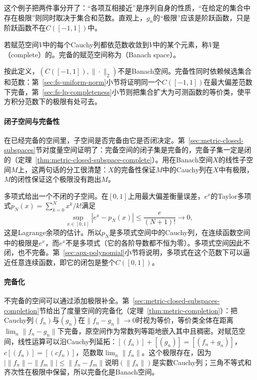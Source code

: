 这个例子把两件事分开了：“各项互相接近”是序列自身的性质，“在给定的集合中存在极限”则同时取决于集合和范数。直观上，$g_n$的“极限”应该是阶跃函数，只是阶跃函数不在$C([-1,1])$中。

\begin{definition}[Banach空间]
\label{def:fs-banach}
若赋范空间$V$中的每个Cauchy列都依范数收敛到$V$中的某个元素，称$V$是（complete）的。完备的赋范空间称为（Banach space）。
\end{definition}

按此定义，$(C([-1,1]),\|\cdot\|_2)$不是Banach空间。完备性同时依赖候选集合和范数：第~\ref{sec:fs-uniform-norm}小节将证明同一个$C([-1,1])$在最大偏差范数下完备，第~\ref{sec:fs-lp-completeness}小节则把集合扩大为可测函数的等价类，使平方积分范数下的极限有处可去。

\paragraph{闭子空间与完备性}
在已经完备的空间里，子空间是否完备由它是否闭决定。第~\ref{sec:metric-closed-subspaces}节对度量空间证明了：完备空间的闭子集是完备的，完备子集一定是闭的（定理~\ref{thm:metric-closed-subspace-complete}）。用在Banach空间$X$的线性子空间$M$上，这两句话的分工很清楚：$X$的完备性保证$M$中的Cauchy列在$X$中有极限，$M$的闭性保证这个极限没有跑出$M$。

多项式给出一个不闭的子空间。在$[0,1]$上用最大偏差衡量误差，$e^x$的Taylor多项式$p_N(x)=\sum_{k=0}^Nx^k/k!$满足
\[
 \sup_{x\in[0,1]}|e^x-p_N(x)|\leq\frac{e}{(N+1)!}\to0,
\]
这是Lagrange余项的估计。所以$p_N$是多项式空间中的Cauchy列，在连续函数空间中的极限是$e^x$，而$e^x$不是多项式（它的各阶导数都不恒为零）。多项式空间因此不闭，也不完备。第~\ref{sec:apx-polynomial}小节将说明，多项式在这个范数下可以逼近任意连续函数，即它的闭包是整个$C([0,1])$。

\paragraph{完备化}
不完备的空间可以通过添加极限补全。第~\ref{sec:metric-closed-subspaces-completion}节给出了度量空间的完备化（定理~\ref{thm:metric-completion}）：把Cauchy列$(f_n)$与$(g_n)$在$\|f_n-g_n\|\to0$时视为等价，等价类全体在距离$\lim_n\|f_n-g_n\|$下完备，原空间作为常数列等距地嵌入其中且稠密。对赋范空间，线性运算可以沿Cauchy列延拓：$[(f_n)]+[(g_n)]=[(f_n+g_n)]$，$c[(f_n)]=[(cf_n)]$，范数取$\lim_n\|f_n\|$。这个极限存在，因为$\bigl|\|f_n\|-\|f_m\|\bigr|\leq\|f_n-f_m\|$说明$(\|f_n\|)$是实数Cauchy列；三角不等式和齐次性在极限中保留，所以完备化是Banach空间。

